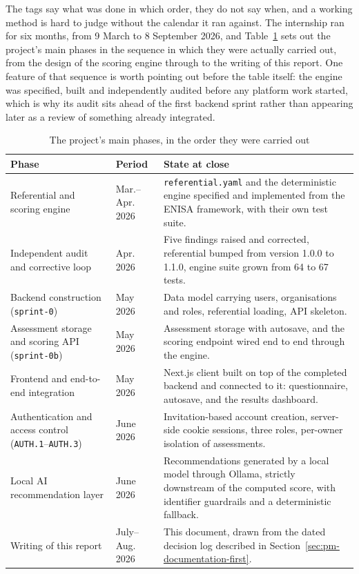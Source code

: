 The tags say what was done in which order, they do not say when, and a working method is hard to judge without the calendar it ran against. The internship ran for six months, from 9 March to 8 September 2026, and Table~\ref{tab:pm-timeline} sets out the project's main phases in the sequence in which they were actually carried out, from the design of the scoring engine through to the writing of this report. One feature of that sequence is worth pointing out before the table itself: the engine was specified, built and independently audited before any platform work started, which is why its audit sits ahead of the first backend sprint rather than appearing later as a review of something already integrated.

\begin{table}[htbp]
  \centering
  \begin{tabular}{@{}>{\raggedright\arraybackslash}p{}>{\raggedright\arraybackslash}p{}p{}@{}}
    \toprule
    Phase & Period & State at close \\
    \midrule
    Referential and scoring engine & Mar.--Apr. 2026 & \texttt{referential.\allowbreak yaml} and the deterministic engine specified and implemented from the ENISA framework, with their own test suite. \\
    Independent audit and corrective loop & Apr. 2026 & Five findings raised and corrected, referential bumped from version 1.0.0 to 1.1.0, engine suite grown from 64 to 67 tests. \\
    Backend construction (\texttt{sprint-0}) & May 2026 & Data model carrying users, organisations and roles, referential loading, API skeleton. \\
    Assessment storage and scoring API (\texttt{sprint-0b}) & May 2026 & Assessment storage with autosave, and the scoring endpoint wired end to end through the engine. \\
    Frontend and end-to-end integration & May 2026 & Next.js client built on top of the completed backend and connected to it: questionnaire, autosave, and the results dashboard. \\
    Authentication and access control (\texttt{AUTH.1}--\texttt{AUTH.3}) & June 2026 & Invitation-based account creation, server-side cookie sessions, three roles, per-owner isolation of assessments. \\
    Local AI recommendation layer & June 2026 & Recommendations generated by a local model through Ollama, strictly downstream of the computed score, with identifier guardrails and a deterministic fallback. \\
    Writing of this report & July--Aug. 2026 & This document, drawn from the dated decision log described in Section~\ref{sec:pm-documentation-first}. \\
    \bottomrule
  \end{tabular}
  \caption{The project's main phases, in the order they were carried out}
  \label{tab:pm-timeline}
\end{table}

